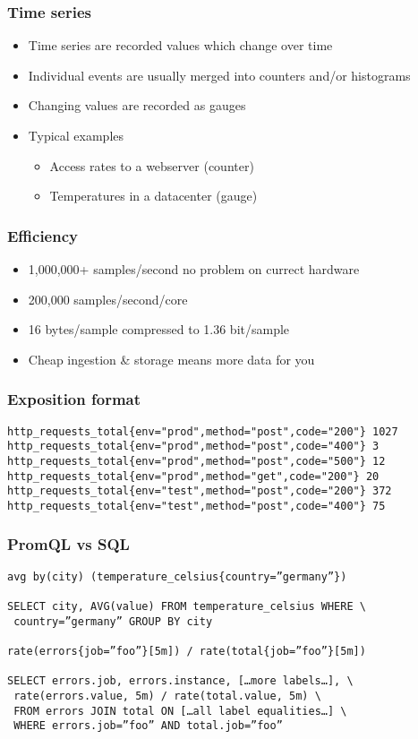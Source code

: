 \documentclass[t]{beamer}
\begin{document}
\begin{frame}
	\frametitle{Time series}
	\begin{itemize}
		\item Time series are recorded values which change over time
		\item Individual events are usually merged into counters and/or histograms
		\item Changing values are recorded as gauges
		\item Typical examples
		\begin{itemize}
			\item Access rates to a webserver (counter)
			\item Temperatures in a datacenter (gauge)
		\end{itemize}
	\end{itemize}
\end{frame}

\begin{frame}
	\frametitle{Efficiency}
	\begin{itemize}
		\item 1,000,000+ samples/second no problem on currect hardware
		\item 200,000 samples/second/core
		\item 16 bytes/sample compressed to 1.36 bit/sample
		\item Cheap ingestion \& storage means more data for you
	\end{itemize}
\end{frame}

\begin{frame}[fragile]
	\frametitle{Exposition format}
	\fontsize{10pt}{12}\selectfont
	\begin{verbatim}
http_requests_total{env="prod",method="post",code="200"} 1027
http_requests_total{env="prod",method="post",code="400"} 3
http_requests_total{env="prod",method="post",code="500"} 12
http_requests_total{env="prod",method="get",code="200"} 20
http_requests_total{env="test",method="post",code="200"} 372
http_requests_total{env="test",method="post",code="400"} 75
	\end{verbatim}
\end{frame}

\begin{frame}[fragile]
	\frametitle{PromQL vs SQL}
	\fontsize{10pt}{12}\selectfont
	\begin{verbatim}
avg by(city) (temperature_celsius{country=”germany”})

SELECT city, AVG(value) FROM temperature_celsius WHERE \
 country=”germany” GROUP BY city

rate(errors{job=”foo”}[5m]) / rate(total{job=”foo”}[5m])

SELECT errors.job, errors.instance, […more labels…], \
 rate(errors.value, 5m) / rate(total.value, 5m) \
 FROM errors JOIN total ON […all label equalities…] \
 WHERE errors.job=”foo” AND total.job=”foo”
	\end{verbatim}
\end{frame}
\end{document}
